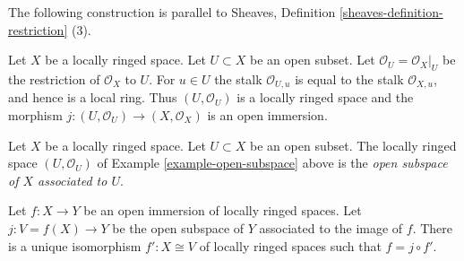 \noindent
The following construction is parallel to
Sheaves, Definition \ref{sheaves-definition-restriction} (3).

\begin{example}
\label{example-open-subspace}
Let $X$ be a locally ringed space.
Let $U \subset X$ be an open subset.
Let $\mathcal{O}_U = \mathcal{O}_X|_U$
be the restriction of $\mathcal{O}_X$ to $U$.
For $u \in U$ the stalk $\mathcal{O}_{U, u}$
is equal to the stalk $\mathcal{O}_{X, u}$, and hence is a
local ring. Thus $(U, \mathcal{O}_U)$ is a locally ringed
space and the morphism $j : (U, \mathcal{O}_U) \to (X, \mathcal{O}_X)$
is an open immersion.
\end{example}

\begin{definition}
\label{definition-open-subspace}
Let $X$ be a locally ringed space.
Let $U \subset X$ be an open subset.
The locally ringed space $(U, \mathcal{O}_U)$
of Example \ref{example-open-subspace} above
is the {\it open subspace of $X$ associated to $U$}.
\end{definition}

\begin{lemma}
\label{lemma-open-immersion}
Let $f : X \to Y$ be an open immersion of
locally ringed spaces. Let $j : V = f(X) \to Y$
be the open subspace of $Y$ associated to the image of $f$.
There is a unique isomorphism $f' : X \cong V$ of
locally ringed spaces such that $f = j \circ f'$.
\end{lemma}

